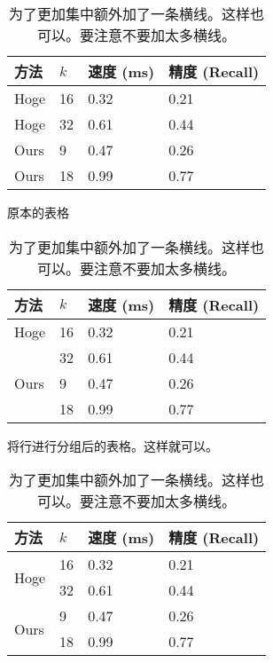 \documentclass{article}
\begin{document}
\begin{table}[h]
    \begin{minipage}[t]{0.32\linewidth}
        \centering
        \begin{tabular}{@{}llll@{}} \toprule
            方法 & $k$ & 速度 (ms) & 精度 (Recall) \\ \midrule
            Hoge  & 16 & 0.32 & 0.21  \\ 
            Hoge  & 32 & 0.61 & 0.44  \\ 
            Ours  &  9 & 0.47 & 0.26 \\ 
            Ours  & 18 & 0.99 & 0.77 \\ \bottomrule   
        \end{tabular}
        \caption{原本的表格}
        \label{tbl:row_group1}
    \end{minipage}
    \hfill
    \begin{minipage}[t]{0.32\linewidth}
        \centering
        \begin{tabular}{@{}llll@{}} \toprule
            方法 & $k$ & 速度 (ms) & 精度 (Recall) \\ \midrule
            Hoge  & 16 & 0.32 & 0.21  \\ 
                  & 32 & 0.61 & 0.44  \\ 
            Ours  &  9 & 0.47 & 0.26 \\ 
                  & 18 & 0.99 & 0.77 \\ \bottomrule   
        \end{tabular}
        \caption{将行进行分组后的表格。这样就可以。}
        \label{tbl:row_group2}
    \end{minipage}
    \hfill
    \begin{minipage}[t]{0.32\linewidth}
        \centering
        \begin{tabular}{@{}llll@{}} \toprule
            方法 & $k$ & 速度 (ms) & 精度 (Recall) \\ \midrule
            \multirow{2}{*}{Hoge}  & 16 & 0.32 & 0.21  \\ 
                                   & 32 & 0.61 & 0.44  \\ \midrule  
            \multirow{2}{*}{Ours}  &  9 & 0.47 & 0.26 \\ 
                                   & 18 & 0.99 & 0.77 \\ \bottomrule   
        \end{tabular}
        \caption{为了更加集中额外加了一条横线。这样也可以。要注意不要加太多横线。}
        \label{tbl:row_group3}
    \end{minipage}
\end{table}
\end{document}
